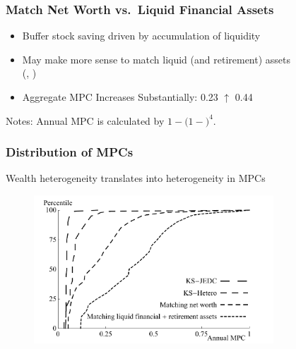 \documentclass{beamer}
\newcommand{\jemph}[1]{{\color{jirkasred}#1}}
\begin{document}
\begin{frame}
\frametitle{{Match Net Worth vs.\ Liquid Financial Assets
}}

\begin{itemize}
  \item Buffer stock saving driven by accumulation of \jemph{liquidity}
  \item May make more sense to match liquid (and retirement) assets\\ (\citet{hall:slump}, \citet{kvStim})
  \item \jemph{Aggregate MPC Increases Substantially: 0.23 $\uparrow$ 0.44}
\end{itemize}

\begin{footnotesize}
\begin{table}

\end{table}
\tiny{Notes: Annual MPC is calculated by $1-(1-$$)^{4}$.}
\end{footnotesize}

\end{frame}





\begin{frame}[label=cfunc]
\frametitle{{Distribution of MPCs}}

{\jemph{Wealth heterogeneity translates into heterogeneity in MPCs}}

\begin{figure}
\centering
\includegraphics[width=0.8\textwidth]{../Figures/DistributionsMPCsDistSevenAndKSKSAggShocksPlot.pdf}

\end{figure}

\end{frame}
\end{document}
